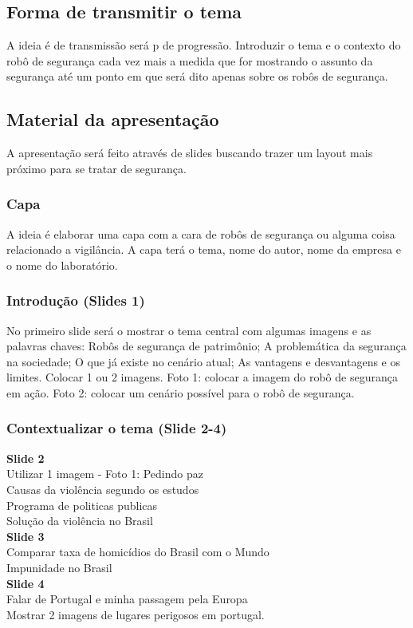 \documentclass[12pt,a4paper]{article}
\begin{document}
    \subsection{Forma de transmitir o tema}
    A ideia é de transmissão será p de progressão. Introduzir o tema e o contexto do robô de segurança cada vez mais a medida que for mostrando o assunto da segurança até um ponto em que será dito apenas sobre os robôs de segurança. 

    \subsection{Material da apresentação}
    A apresentação será feito através de slides buscando trazer um layout mais próximo para se tratar de segurança.

    \subsubsection{Capa}
    A ideia é elaborar uma capa com a cara de robôs de segurança ou alguma coisa relacionado a vigilância. A capa terá o tema, nome do autor, nome da empresa e o nome do laboratório.

    \subsubsection{Introdução (Slides 1)}
    No primeiro slide será o mostrar o tema central com algumas imagens e as palavras chaves: Robôs de segurança de patrimônio; A problemática da segurança na sociedade;  O que já existe no cenário atual; As vantagens e desvantagens e os limites. Colocar 1 ou 2 imagens. Foto 1: colocar a imagem do robô de segurança em ação. Foto 2: colocar um cenário possível para o robô de segurança. 

    \subsubsection{Contextualizar o tema (Slide 2-4)}
    \textbf{Slide 2} \\
    Utilizar 1 imagem - Foto 1: Pedindo paz \\
    Causas da violência segundo os estudos \\
    Programa de politicas publicas \\
    Solução da violência no Brasil \\
    \textbf{Slide 3} \\
    Comparar taxa de homicídios do Brasil com o Mundo \\
    Impunidade no Brasil \\
    \textbf{Slide 4} \\
    Falar de Portugal e minha passagem pela Europa \\
    Mostrar 2 imagens de lugares perigosos em portugal.
\end{document}
